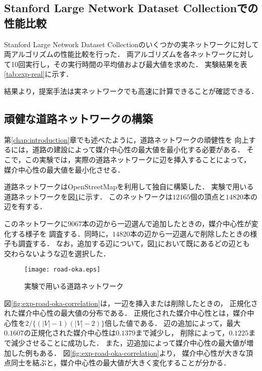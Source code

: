 \subsection{Stanford Large Network Dataset Collectionでの性能比較}
\label{subsect:exp-real}
Stanford Large Network Dataset Collectionのいくつかの実ネットワークに対して
両アルゴリズムの性能比較を行った．
両アルゴリズムを各ネットワークに対して10回実行し，その実行時間の平均値および最大値を求めた．
実験結果を表\ref{tab:exp-real}に示す．



結果より，提案手法は実ネットワークでも高速に計算できることが確認できる．

\subsection{頑健な道路ネットワークの構築}
\label{subsect:exp-road}

第\ref{chap:introduction}章でも述べたように，道路ネットワークの頑健性を
向上するには，道路の建設によって媒介中心性の最大値を最小化する必要がある．
そこで，この実験では，実際の道路ネットワークに辺を挿入することによって，
媒介中心性の最大値を最小化させる．

道路ネットワークはOpenStreetMap\cite{OpenStreetMap}を利用して独自に構築した．
実験で用いる道路ネットワークを図\ref{fig:road-okayama}に示す．
このネットワークは$12165$個の頂点と$14820$本の辺を有する．

このネットワークに$9067$本の辺から一辺選んで追加したときの，媒介中心性が変化する様子を
調査する．同時に，$14820$本の辺から一辺選んで削除したときの様子も調査する．
なお，追加する辺について，図\ref{fig:road-okayama}において既にあるどの辺とも
交わらないような辺を選択した．

\begin{figure}[tb]
  \centering
  \texttt{[image: road-oka.eps]}
  \caption{実験で用いる道路ネットワーク}
  \label{fig:road-okayama}
\end{figure}

図\ref{fig:exp-road-oka-correlation}は，一辺を挿入または削除したときの，
正規化された媒介中心性の最大値の分布である．
正規化された媒介中心性とは，媒介中心性を$2/\{(|V|-1)(|V|-2)\}$倍した値である．
辺の追加によって，最大$0.1607$の正規化された媒介中心性は$0.1379$まで減少し，
削除によって，$0.1225$まで減少させることに成功した．
また，辺追加によって媒介中心性の最大値が増加した例もある．
図\ref{fig:exp-road-oka-correlation}より，
媒介中心性が大きな頂点同士を結ぶと，媒介中心性の最大値が大きく変化することが分かる．


